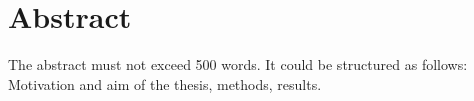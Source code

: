 \thispagestyle{plain}
\section*{Abstract}

The abstract must not exceed 500 words. \newline
It could be structured as follows: Motivation and aim of the thesis, methods, results.

\vspace{0.1cm}

\blindtext[3]

